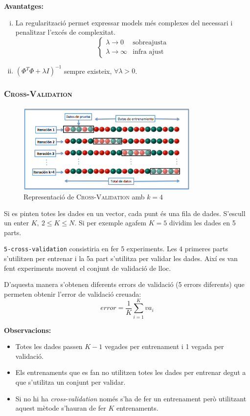 \documentclass[a4paper]{article}
\begin{document}
\textbf{Avantatges:}

\begin{enumerate}[i)]
	\item La regularització permet expressar models més complexes del necessari i penalitzar l'excés de complexitat.
	$$
	\begin{cases}
		\lambda \rightarrow 0 &\text{sobreajusta} \\
		\lambda \rightarrow \infty &\text{infra ajust}
	\end{cases}
	$$
	
	\item $\left( \Phi^T \Phi + \lambda I \right)^{-1}$ sempre existeix, $\forall \lambda > 0$.
\end{enumerate}

\subsubsection{\textsc{Cross-Validation}}

\begin{figure}[H]
    \centering
    \includegraphics[width=0.8\textwidth]{images/K-fold_cross_validation}
    \caption{Representació de \textsc{Cross-Validation} amb $k=4$}
\end{figure}

Si es pinten totes les dades en un vector, cada punt és una fila de dades. S'escull un enter $K, \ 2 \le K \le N$. Si per exemple agafem $K=5$ dividim les dades en 5 parts. 

\verb|5-cross-validation| consistiria en fer 5 experiments. Les 4 primeres parts s'utilitzen per entrenar i la 5a part s'utilitza per validar les dades. Així es van fent experiments movent el conjunt de validació de lloc.

D'aquesta manera s'obtenen diferents errors de validació (5 errors diferents) que permeten obtenir l'error de validació creuada:
$$
error = \frac{1}{K} \sum_{i=1}^K va_i
$$

\textbf{Observacions:}
\begin{itemize}
	\item Totes les dades passen $K - 1$ vegades per entrenament i 1 vegada per validació.
	\item Els entrenaments que es fan no utilitzen totes les dades per entrenar degut a que s'utilitza un conjunt per validar.
	\item Si no hi ha \emph{cross-validation} només s'ha de fer un entrenament però utilitzant aquest mètode s'hauran de fer $K$ entrenaments.
\end{itemize}
\end{document}

